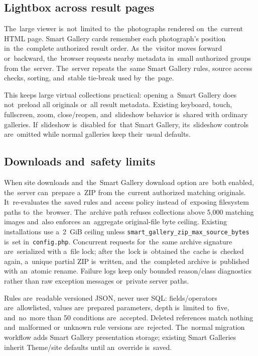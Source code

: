 \documentclass[11pt,a4paper]{article}
\begin{document}
\subsection{Lightbox across result pages}

The~large viewer is~not~limited to~the~photographs rendered on~the~current HTML
page. Smart Gallery cards remember each photograph's position in~the~complete
authorized result order. As~the~visitor moves forward or~backward, the~browser
requests nearby metadata in~small authorized groups from the~server. The~server
repeats the~same Smart Gallery rules, source access checks, sorting, and~stable
tie-break used by~the~page.

This keeps large virtual collections practical: opening a~Smart Gallery does
not~preload all originals or~all result metadata. Existing keyboard, touch,
fullscreen, zoom, close/reopen, and~slideshow behavior is~shared with ordinary
galleries. If~slideshow is~disabled for~that Smart Gallery, its~slideshow
controls are~omitted while normal galleries keep their~usual defaults.

\subsection{Downloads and~safety limits}

When site downloads and~the~Smart Gallery download option are~both enabled,
the~server can~prepare a~ZIP from the~current authorized matching originals.
It~re-evaluates the~saved rules and~access policy instead of~exposing filesystem
paths to~the~browser. The~archive path refuses collections above 5,000 matching
images and~also enforces an~aggregate original-file byte ceiling. Existing
installations use a~2~GiB ceiling unless
\texttt{smart\_gallery\_zip\_max\_source\_bytes} is~set in~\texttt{config.php}.
Concurrent requests for~the~same archive signature are~serialized with a~file
lock; after the~lock is~obtained the~cache is~checked again, a~unique partial
ZIP is~written, and~the~completed archive is~published with an~atomic rename.
Failure logs keep only bounded reason/class diagnostics rather than raw
exception messages or~private server paths.

Rules are~readable versioned JSON, never user SQL: fields/operators
are~allowlisted, values are~prepared parameters, depth is~limited to~five,
and~no~more than 50 conditions are~accepted. Deleted references match nothing
and~malformed or~unknown rule versions are~rejected. The~normal migration
workflow adds Smart Gallery presentation storage; existing Smart Galleries
inherit Theme/site defaults until an~override is~saved.
\end{document}
